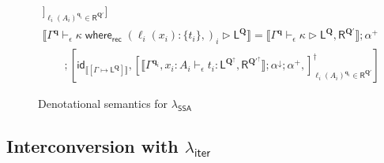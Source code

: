 \documentclass[acmsmall,screen,review]{acmart}
\newcommand{\mc}[1]{\ensuremath{\mathcal{#1}}}
\newcommand{\mb}[1]{\ensuremath{\mathbf{#1}}}
\newcommand{\ms}[1]{\ensuremath{\mathsf{#1}}}
\newcommand{\lto}{:}
\newcommand{\cwhere}[2]{#1\;\ms{where}_{\ms{rec}}\;#2}
\newcommand{\wbranch}[3]{#1(#2) \lto \{#3\}}
\newcommand{\hasty}[4]{#1 \vdash_{#2} #3: {#4}}
\newcommand{\haslb}[4]{#1 \vdash_{#2} #3 \rhd #4}
\newcommand{\tref}{\twoheadrightarrow}
\newcommand{\lbref}[5]{#1 \vdash_{#2} #3 \tref #4 \rhd {#5}}
\newcommand{\ltoty}[2]{[#1 \mapsto #2]}
\newcommand{\dnt}[1]{\llbracket{#1}\rrbracket}
\newcommand{\subiterexp}{\texorpdfstring{\(\lambda_{\ms{iter}}\)}{lambda-iter}}
\newcommand{\isotopessa}{\(\lambda_{\ms{SSA}}\)}
\newcommand{\zeroqv}[1]{#1^\uparrow}
\begin{document}
\begin{figure}
\begin{adjustbox}{minipage=1.1\textwidth,scale=0.9}
\begin{gather*}
      ]_{\ell_i(A_i)^{\mb{q}_i} \in \ms{R}^{\mb{Q}'}}
    ]
    \\
    \dnt
    {\haslb{\Gamma^{\mb{q}}}{\epsilon}{\cwhere{\kappa}{(\wbranch{\ell_i}{x_i}{t_i},)_i}}
      {\ms{L}^{\mb{Q}}}}
    = \dnt{\haslb{\Gamma^{\mb{q}}}{\epsilon}{\kappa}
      {\ms{L}^{\mb{Q}}, \ms{R}^{\mb{Q}'}}} ; \alpha^+
    \\
    \qquad ; [
      \ms{id}_{\dnt{\ltoty{\Gamma}{\ms{L}^{\mb{Q}}}}},
      [
        \dnt{\hasty{\Gamma^{\mb{q}_i}, x_i : A_i}{\epsilon}{t_i}
          {\ms{L}^{\zeroqv{\mb{Q}}}, \ms{R}^{\zeroqv{\mb{Q}'}}}} ; \alpha^\downarrow ; \alpha^+,
      ]_{\ell_i(A_i)^{\mb{q}_i} \in \ms{R}^{\mb{Q}'}}^\dagger
    ]
  \end{gather*}
  \end{adjustbox}
  \caption{Denotational semantics for \isotopessa{}}
  \Description{}
  \label{fig:ssa-densem}
\end{figure}

\subsection{Interconversion with \subiterexp{}}
\label{ssec:interconversion}

\end{document}
